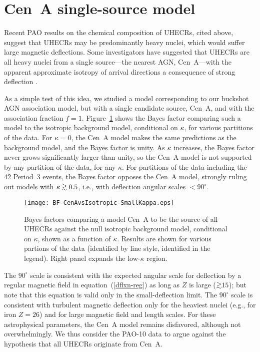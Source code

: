 \section{Cen~A single-source model}
\label{app:CenA}

Recent PAO results on the chemical composition of UHECRs, cited above,
suggest that UHECRs may be predominantly heavy nuclei, which would
suffer large magnetic deflections.  Some investigators have suggested
that UHECRs are all heavy nuclei from a single source---the nearest AGN,
Cen~A---with the apparent approximate isotropy of arrival directions
a consequence of strong deflection \cite{B+09-CenA,GBdS10-CenA,BdS12-CenA}.

As a simple test of this idea, we studied a model corresponding to our
buckshot AGN association model, but with a single candidate source, Cen~A, and
with the association fraction $f=1$.  Figure~\ref{fig:BF-CenA} shows the Bayes
factor comparing such a model to the isotropic background model, conditional
on $\kappa$, for various partitions of the data.  For $\kappa=0$, the Cen~A
model makes the same predictions as the background model, and the Bayes factor
is unity.  As $\kappa$ increases, the Bayes factor never grows significantly
larger than unity, so the Cen~A model is not supported by any partition of the
data, for any $\kappa$.  For partitions of the data including the 42 Period~3
events, the Bayes factor opposes the Cen~A model, strongly ruling out models
with $\kappa\simgreat 0.5$, i.e., with deflection angular scales $<90^\circ$.

\begin{figure}
\centerline{\texttt{[image: BF-CenAvsIsotropic-SmallKappa.eps]}}
\caption{Bayes factors comparing a model Cen~A to be the source of
all UHECRs against the null isotropic background model, conditional
on $\kappa$, shown as a function of $\kappa$.  Results are
shown for various partions of the data (identified by line style,
identified in the legend).  Right panel expands the low-$\kappa$ region.}
\label{fig:BF-CenA}
\end{figure}

The $90^\circ$ scale is consistent with the expected angular scale for
deflection by a regular magnetic field in equation~(\ref{dflxn-reg}) as long
as $Z$ is large ($\simgreat 15$); but note that this equation is valid only in
the small-deflection limit.  The $90^\circ$ scale is consistent with turbulent
magnetic deflection only for the heaviest nuclei (e.g., for iron $Z=26$) and
for large magnetic field and length scales.  For these astrophysical
parameters, the Cen~A model remains disfavored, although not overwhelmingly. 
We thus consider the PAO-10 data to argue against the hypothesis that all
UHECRs originate from Cen~A.
